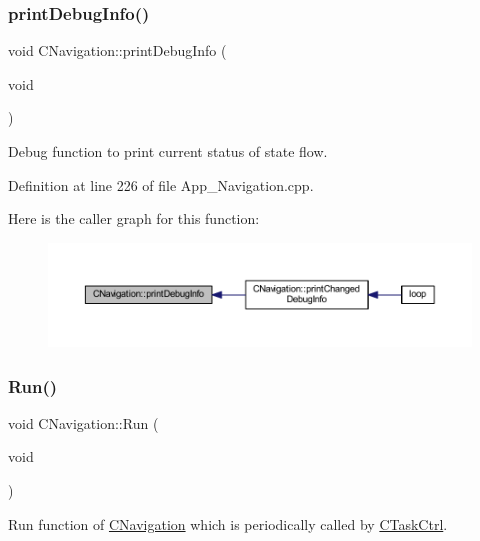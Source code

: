 \subsubsection{\texorpdfstring{print\+Debug\+Info()}{printDebugInfo()}}
{\footnotesize\ttfamily void C\+Navigation\+::print\+Debug\+Info (\begin{DoxyParamCaption}\item[{void}]{ }\end{DoxyParamCaption})\hspace{0.3cm}{\ttfamily [virtual]}}



Debug function to print current status of state flow. 



Definition at line 226 of file App\+\_\+\+Navigation.\+cpp.

Here is the caller graph for this function\+:
\nopagebreak
\begin{figure}[H]
\begin{center}
\leavevmode
\includegraphics[width=350pt]{class_c_navigation_a84e320cd8975593ab6f966e8794b2886_icgraph}
\end{center}
\end{figure}
\mbox{\label{class_c_navigation_a86acb1521aab400e542465c8eabed671}} 
\subsubsection{\texorpdfstring{Run()}{Run()}}
{\footnotesize\ttfamily void C\+Navigation\+::\+Run (\begin{DoxyParamCaption}\item[{void}]{ }\end{DoxyParamCaption})\hspace{0.3cm}{\ttfamily [virtual]}}



Run function of \mbox{\hyperlink{class_c_navigation}{C\+Navigation}} which is periodically called by \mbox{\hyperlink{class_c_task_ctrl}{C\+Task\+Ctrl}}. 

